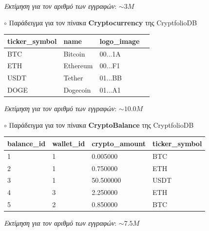 \documentclass[a4paper,12pt]{article}
\begin{document}
\begin{flushright}
\textit{Εκτίμηση για τον αριθμό των εγγραφών}: $\sim3M$
\end{flushright}


\bigskip
\noindent $\circ$ Παράδειγμα για τον πίνακα \textbf{Cryptocurrency} της CryptfolioDB


\noindent \begin{tabular}{|l|l|l|l|}
    \hline
    \textbf{ticker\_symbol} & \textbf{name} & \textbf{logo\_image} \\
    \hline
    BTC & Bitcoin & 00...1A  \\
    \hline
    ETH & Ethereum & 00...F1  \\
    \hline
    USDT & Tether &  01...BB \\
    \hline
    DOGE & Dogecoin & 01...A1 \\
    \hline
\end{tabular}

\begin{flushright}
\textit{Εκτίμηση για τον αριθμό των εγγραφών}: $\sim10.0M$
\end{flushright}



\bigskip
\noindent $\circ$ Παράδειγμα για τον πίνακα \textbf{CryptoBalance} της CryptfolioDB


\noindent \begin{tabular}{|l|l|l|l|}
    \hline
    \textbf{balance\_id} & \textbf{wallet\_id} & \textbf{crypto\_amount} & \textbf{ticker\_symbol} \\
    \hline
    1 & 1 & 0.005000 & BTC \\
    \hline
    2 & 1 & 0.750000 & ETH \\
    \hline
    3 & 1 & 50.500000 & USDT \\
    \hline
    4 & 3 & 2.250000 & ETH  \\
    \hline
    5 & 2 & 0.850000 & BTC  \\
    \hline
\end{tabular}

\begin{flushright}
\textit{Εκτίμηση για τον αριθμό των εγγραφών}: $\sim7.5M$
\end{flushright}
\end{document}
